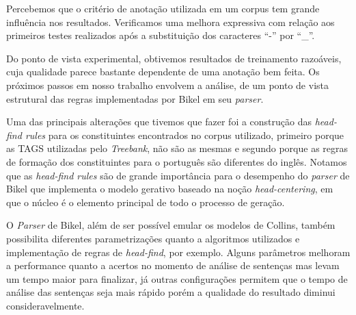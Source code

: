 Percebemos que o critério de anotação utilizada em um corpus tem grande influência nos resultados. Verificamos uma melhora expressiva com relação aos primeiros testes realizados após a substituição dos caracteres ``{-}'' por ``\_''.

Do ponto de vista experimental, obtivemos resultados de treinamento razoáveis, cuja qualidade parece bastante dependente de uma anotação bem feita. Os próximos passos em nosso trabalho envolvem a análise, de um ponto de vista estrutural das regras implementadas por Bikel em seu \emph{parser}.

Uma das principais alterações que tivemos que fazer foi a construção das \emph{head-find rules} para os constituintes encontrados no corpus utilizado, primeiro porque as TAGS utilizadas pelo \emph{Treebank}, não são as mesmas e segundo porque as regras de formação dos constituintes para o português são diferentes do inglês. Notamos que as \emph{head-find rules} são de grande importância para o desempenho do \emph{parser} de Bikel que implementa o modelo gerativo baseado na noção \emph{head-centering}, em que o núcleo é o elemento principal de todo o processo de geração.

O \emph{Parser} de Bikel, além de ser possível emular os modelos de Collins, também possibilita diferentes parametrizações quanto a algoritmos utilizados e implementação de regras de \emph{head-find}, por exemplo. Alguns parâmetros melhoram a performance quanto a acertos no momento de análise de sentenças mas levam um tempo maior para finalizar, já outras configurações permitem que o tempo de análise das sentenças seja mais rápido porém a qualidade do resultado diminui consideravelmente.
